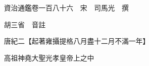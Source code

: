 










 


 
 


 

  
  
  
  
  





  
  
  
  
  
 
  

  

  
  
  



  

 
 

  
   




  

  
  


  　　資治通鑑卷一百八十六　宋　司馬光　撰

　　胡三省　音註

　　唐紀二【起著雍攝提格八月盡十二月不滿一年】

　　高祖神堯大聖光孝皇帝上之中

